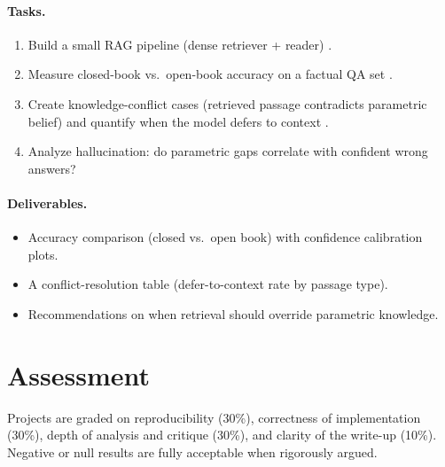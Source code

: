 \documentclass[11pt]{article}
\begin{document}
\paragraph{Tasks.}
\begin{enumerate}[leftmargin=*]
  \item Build a small RAG pipeline (dense retriever + reader) \citep{lewis2020rag,karpukhin2020dpr}.
  \item Measure closed-book vs.\ open-book accuracy on a factual QA set \citep{petroni2019lama}.
  \item Create knowledge-conflict cases (retrieved passage contradicts parametric belief) and quantify when the model defers to context \citep{longpre2021entitybased}.
  \item Analyze hallucination: do parametric gaps correlate with confident wrong answers?
\end{enumerate}

\paragraph{Deliverables.}
\begin{itemize}[leftmargin=*]
  \item Accuracy comparison (closed vs.\ open book) with confidence calibration plots.
  \item A conflict-resolution table (defer-to-context rate by passage type).
  \item Recommendations on when retrieval should override parametric knowledge.
\end{itemize}

\section*{Assessment}
Projects are graded on reproducibility (30\%), correctness of implementation (30\%), depth of analysis and critique (30\%), and clarity of the write-up (10\%). Negative or null results are fully acceptable when rigorously argued.
\end{document}
